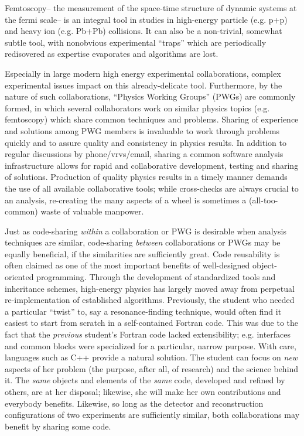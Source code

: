 \documentclass[twoside]{article}
\begin{document}
Femtoscopy-- the measurement of the space-time structure of dynamic systems at the fermi scale--
is an integral tool in studies in high-energy particle (e.g. p+p) and heavy ion (e.g. Pb+Pb)
collisions.  It can also be a non-trivial, somewhat subtle tool, with nonobvious experimental
``traps'' which are periodically redisovered as expertise evaporates and algorithms are lost.

Especially in large modern high energy experimental collaborations, complex experimental
issues impact on this already-delicate tool.  Furthermore, by the nature of such collaborations,
``Physics Working Groups'' (PWGs) are commonly formed, in which several collaborators work on
similar physics topics (e.g. femtoscopy) which share common techniques and problems.  Sharing
of experience and
solutions among PWG members is invaluable to work through problems quickly and to assure quality
and consistency in physics results.  In addition to regular discussions by phone/vrvs/email, sharing
a common software analysis infrastructure allows for rapid and collaborative development, testing
and sharing of solutions.  Production of quality physics results in a timely manner demands the
use of all available collaborative tools; while cross-checks are always crucial to an analysis,
re-creating the many aspects of a wheel is sometimes a (all-too-common) waste of valuable manpower.

Just as code-sharing {\it within} a collaboration or PWG is desirable when analysis techniques
are similar, code-sharing {\it between} collaborations or PWGs may be equally beneficial, if the
similarities are sufficiently great.  Code reusability is often claimed as one of the most important
benefits of well-designed object-oriented programming.  Through the development of standardized tools
and inheritance schemes, high-energy physics has largely moved away from perpetual re-implementation
of established algorithms.  
Previously, the student who needed a particular ``twist'' to, say a resonance-finding technique,
would often find it easiest to start from scratch in a self-contained Fortran code.  This was due
to the fact that the {\it previous} student's Fortran code lacked extensibility; e.g. interfaces
and common blocks were specialized for a particular, narrow purpose.  With care, languages such as
C++ provide a natural solution.  The student can focus on {\it new} aspects of her problem (the purpose,
after all, of research) and the science behind it.  The {\it same} objects and elements of the {\it same} 
code, developed and refined by others, are at her disposal; likewise, she will make her own contributions
and everybody benefits.
Likewise, so long as the detector and reconstruction configurations of two experiments 
are sufficiently similar, both collaborations may benefit by sharing some code.
\end{document}
